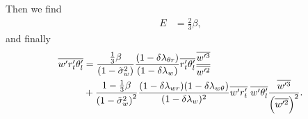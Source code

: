 Then we find
\begin{align}
    \label{eq:E_eq_23beta}
    E &= \frac{2}{3} \beta,
\end{align}
and finally
\begin{align}
    \label{eq:wpqtpthlp_beta}
    \overline{w' r_t' \theta_l'}
    &= \frac{\frac{1}{3}\beta}{\left( 1 - \tilde{\sigma}_w^2 \right)}
    \frac{(1-\delta \lambda_{\theta r})}{(1 - \delta \lambda_w)}
    \overline{r_t' \theta_l'} \frac{\overline{w'^3}}{\overline{w'^2}} \nonumber\\
    &+ \frac{1 - \frac{1}{3}\beta}{\left( 1 - \tilde{\sigma}_w^2 \right)^2}
    \frac{(1-\delta \lambda_{w r})(1-\delta \lambda_{w \theta})} {(1 - \delta \lambda_w)^2}
    \overline{w' r_t'} \; \overline{w' \theta_l'} \frac{\overline{w'^3}}{\left( \overline{w'^2} \right)^2}.
\end{align}